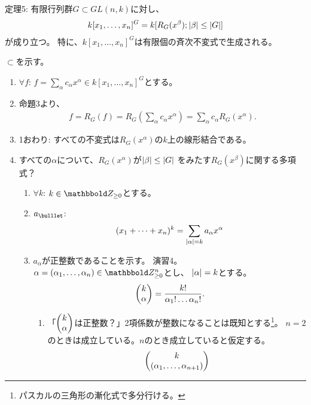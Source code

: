 \begin{framed}
  定理5:
  有限行列群$G\subset GL(n,k)$に対し、
  \begin{align}
    k[x_1,\dots,x_n]^G  = k[R_G(x^\beta); \left|\beta\right|\le \left|G\right|]
  \end{align}
  が成り立つ。
  特に、$k[x_1,\dots,x_n]^G$は有限個の斉次不変式で生成される。
\end{framed}
\begin{myproof}
  $\subset$を示す。
  \begin{enumerate}
    \item $\forall f$: $f=\sum_{\alpha} c_\alpha x^\alpha \in k[x_1,\dots,x_n]^G$とする。
    \item
    命題3より、
    \begin{align}
      f=R_G(f)
      =
      R_G(\sum_{\alpha}c_\alpha x^\alpha)
      =
      \sum_{\alpha}c_\alpha R_G(x^\alpha).
    \end{align}
    \item
    1おわり:
     すべての不変式は$R_G(x^\alpha)$の$k$上の線形結合である。
    \item
    すべての$\alpha$について、$R_G(x^\alpha)$が$\left|\beta\right| \le \left|G\right|$
    をみたす$R_G(x^\beta)$に関する多項式？
     \begin{enumerate}
       \item $\forall k$:
       $k\in \Zge$とする。
       \item
       $a_\bulllet$:
       \begin{align}
         (x_1+\dots+x_n)^k = \sum_{\left|\alpha\right|=k}a_\alpha x^\alpha
       \end{align}
       \item
       $a_\alpha$が正整数であることを示す。
       演習4。$\alpha=(\alpha_1,\dots,\alpha_n)\in \Zge^n$とし、
       $\left|\alpha\right| = k$とする。
       \begin{align}
         \left(\begin{matrix} k\\ \alpha \end{matrix}\right) = \frac{k!}{\alpha_1! \dots \alpha_n!}.
       \end{align}
       \begin{enumerate}
         \item
         「$\left(\begin{matrix} k\\ \alpha \end{matrix}\right)$は正整数？」2項係数が整数になることは既知とする\footnote{パスカルの三角形の漸化式で多分行ける。}。
         $n=2$のときは成立している。$n$のとき成立していると仮定する。
         \begin{align}
           \tatev{k \\ (\alpha_1,\dots,\alpha_{n+1})}

\end{align}
\end{enumerate}
\end{enumerate}
\end{enumerate}
\end{myproof}

